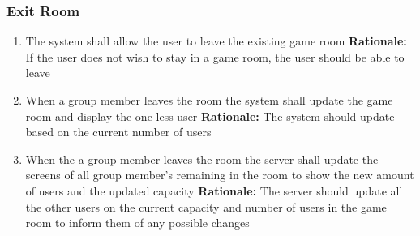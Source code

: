 \documentclass[12pt]{article}
\begin{document}
\subsubsection{Exit Room}
\begin{enumerate}[label=ER\arabic*., series=ExitRoom]
    \item The system shall allow the user to leave the existing game room\newline 
    \textbf{Rationale:} If the user does not wish to stay in a game room, the user should be able to leave
    \item When a group member leaves the room the system shall update the game room and display the one less user\newline 
    \textbf{Rationale:} The system should update based on the current number of users
    \item When the a group member leaves the room the server shall update the screens of all group member's remaining in the room to show the new amount of users and the updated capacity\newline 
    \textbf{Rationale:} The server should update all the other users on the current capacity and number of users in the game room to inform them of any possible changes
\end{enumerate}
\end{document}
